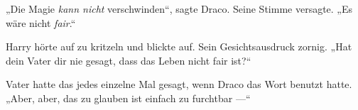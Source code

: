 „Die Magie \emph{kann nicht} verschwinden“, sagte Draco. Seine Stimme versagte.
„Es wäre nicht \emph{fair}.“

Harry hörte auf zu kritzeln und blickte auf. Sein Gesichtsausdruck zornig.
„Hat dein Vater dir nie gesagt, dass das Leben nicht fair ist?“

Vater hatte das jedes einzelne Mal gesagt, wenn Draco das Wort benutzt hatte.
„Aber, aber, das zu glauben ist einfach zu furchtbar —“

